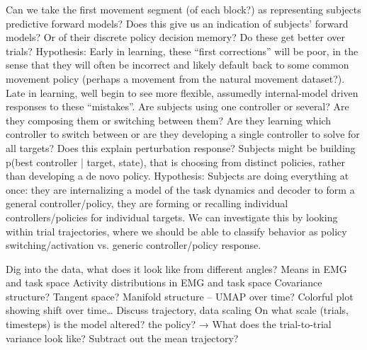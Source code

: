\documentclass[../main.tex]{subfiles}
\begin{document}
Can we take the first movement segment (of each block?) as representing subjects predictive forward models? Does this give us an indication of subjects' forward models? Or of their discrete policy decision memory? Do these get better over trials?
Hypothesis: Early in learning, these “first corrections” will be poor, in the sense that they will often be incorrect and likely default back to some common movement policy (perhaps a movement from the natural movement dataset?). Late in learning, well begin to see more flexible, assumedly internal-model driven responses to these “mistakes”. 
Are subjects using one controller or several? Are they composing them or switching between them? Are they learning which controller to switch between or are they developing a single controller to solve for all targets? Does this explain perturbation response? Subjects might be building p(best controller | target, state), that is choosing from distinct policies, rather than developing a de novo policy.
Hypothesis: Subjects are doing everything at once: they are internalizing a model of the task dynamics and decoder to form a general controller/policy, they are forming or recalling individual controllers/policies for individual targets. We can investigate this by looking within trial trajectories, where we should be able to classify behavior as policy switching/activation vs. generic controller/policy response.

Dig into the data, what does it look like from different angles?
Means in EMG and task space
Activity distributions in EMG and task space
Covariance structure?
Tangent space?
Manifold structure – UMAP over time? Colorful plot showing shift over time… 
Discuss trajectory, data scaling
On what scale (trials, timesteps) is the model altered? the policy? →
What does the trial-to-trial variance look like?
Subtract out the mean trajectory?
\end{document}

